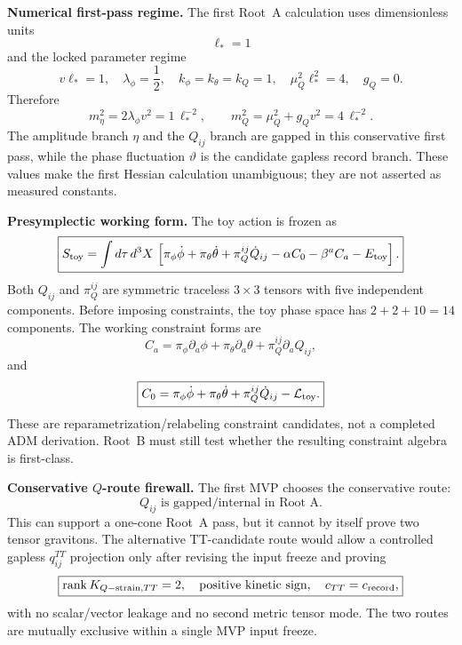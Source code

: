 \documentclass[11pt]{article}
\begin{document}
\medskip\noindent\textbf{Numerical first-pass regime.}
The first Root~A calculation uses dimensionless units
\[
\boxed{\ell_*=1}
\]
and the locked parameter regime
\[
\boxed{
v\ell_*=1,\quad
\lambda_\phi=\frac12,\quad
k_\phi=k_\theta=k_Q=1,\quad
\mu_Q^2\ell_*^2=4,\quad
g_Q=0 .
}
\]
Therefore
\[
\boxed{
m_\eta^2=2\lambda_\phi v^2=1\,\ell_*^{-2},\qquad
m_Q^2=\mu_Q^2+g_Qv^2=4\,\ell_*^{-2}.
}
\]
The amplitude branch \(\eta\) and the \(Q_{ij}\) branch are gapped in this
conservative first pass, while the phase fluctuation \(\vartheta\) is the
candidate gapless record branch.  These values make the first Hessian
calculation unambiguous; they are not asserted as measured constants.

\medskip\noindent\textbf{Presymplectic working form.}
The toy action is frozen as
\[
\boxed{
S_{\rm toy}=\int d\tau\,d^3X\,
\left[
\pi_\phi\dot\phi+\pi_\theta\dot\theta+\pi_Q^{ij}\dot Q_{ij}
-\alpha C_0-\beta^a C_a-E_{\rm toy}
\right].
}
\]
Both \(Q_{ij}\) and \(\pi_Q^{ij}\) are symmetric traceless \(3\times3\)
tensors with five independent components.  Before imposing constraints, the
toy phase space has \(2+2+10=14\) components.  The working constraint forms are
\[
\boxed{
C_a=\pi_\phi\partial_a\phi+\pi_\theta\partial_a\theta
  +\pi_Q^{ij}\partial_aQ_{ij},
}
\]
and
\[
\boxed{
C_0=\pi_\phi\dot\phi+\pi_\theta\dot\theta+\pi_Q^{ij}\dot Q_{ij}
  -\mathcal L_{\rm toy}.
}
\]
These are reparametrization/relabeling constraint candidates, not a completed
ADM derivation.  Root~B must still test whether the resulting constraint
algebra is first-class.

\medskip\noindent\textbf{Conservative \(Q\)-route firewall.}
The first MVP chooses the conservative route:
\[
\boxed{
Q_{ij}\text{ is gapped/internal in Root A.}
}
\]
This can support a one-cone Root~A pass, but it cannot by itself prove two
tensor gravitons.  The alternative TT-candidate route would allow a controlled
gapless \(q_{ij}^{TT}\) projection only after revising the input freeze and
proving
\[
\boxed{
\operatorname{rank}K_{Q{\rm -strain},TT}=2,\quad
\text{positive kinetic sign},\quad
c_{TT}=c_{\rm record},
}
\]
with no scalar/vector leakage and no second metric tensor mode.  The two
routes are mutually exclusive within a single MVP input freeze.
\end{document}
